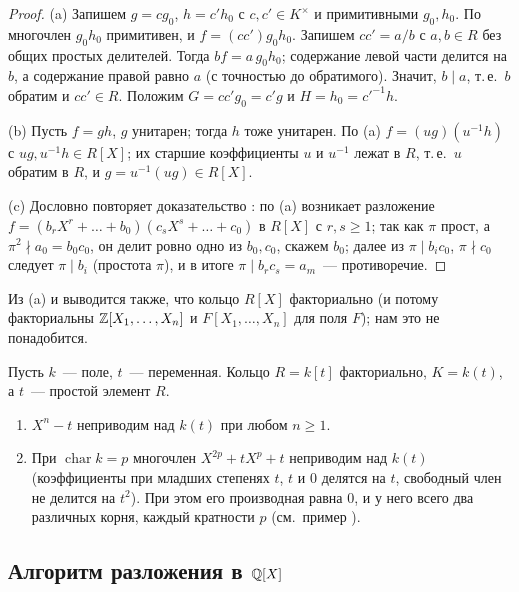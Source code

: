 \begin{proof}
(a) Запишем $g=cg_0$, $h=c'h_0$ с $c,c'\in K^\times$ и примитивными $g_0,h_0$. По  многочлен $g_0h_0$ примитивен,
и $f=(cc')g_0h_0$. Запишем $cc'=a/b$ с $a,b\in R$ без общих простых делителей. Тогда $bf=a\,g_0h_0$; содержание левой
части делится на $b$, а содержание правой равно $a$ (с точностью до обратимого). Значит, $b\mid a$, т.\,е.\ $b$ обратим и
$cc'\in R$. Положим $G=cc'g_0=c'g$ и $H=h_0=c'^{-1}h$.

(b) Пусть $f=gh$, $g$ унитарен; тогда $h$ тоже унитарен. По (a) $f=(ug)(u^{-1}h)$ с $ug,u^{-1}h\in R[X]$; их старшие
коэффициенты $u$ и $u^{-1}$ лежат в $R$, т.\,е.\ $u$ обратим в $R$, и $g=u^{-1}(ug)\in R[X]$.

(c) Дословно повторяет доказательство : по (a) возникает разложение $f=(b_rX^r+\dots+b_0)(c_sX^s+\dots+c_0)$ в
$R[X]$ с $r,s\ge1$; так как $\pi$ прост, а $\pi^2\nmid a_0=b_0c_0$, он делит ровно одно из $b_0,c_0$, скажем $b_0$; далее
из $\pi\mid b_ic_0$, $\pi\nmid c_0$ следует $\pi\mid b_i$ (простота $\pi$), и в итоге $\pi\mid b_rc_s=a_m$~---
противоречие.
\end{proof}

Из (a) и  выводится также, что кольцо $R[X]$ факториально (и потому факториальны $\mathbb Z[X_1,\dots,X_n]$ и
$F[X_1,\dots,X_n]$ для поля $F$); нам это не понадобится.

\begin{example}[1.16d]
Пусть $k$~--- поле, $t$~--- переменная. Кольцо $R=k[t]$ факториально, $K=k(t)$, а $t$~--- простой элемент $R$.
\begin{enumerate}[label=(\alph*)]
\item $X^n-t$ неприводим над $k(t)$ при любом $n\ge1$.
\item При $\operatorname{char}k=p$ многочлен $X^{2p}+tX^p+t$ неприводим над $k(t)$ (коэффициенты при младших степенях
$t$, $t$ и $0$ делятся на $t$, свободный член не делится на $t^2$). При этом его производная равна $0$, и у него всего
два различных корня, каждый кратности $p$ (см.\ пример ).
\end{enumerate}
\end{example}

\subsection*{Алгоритм разложения в $\mathbb Q[X]$}

